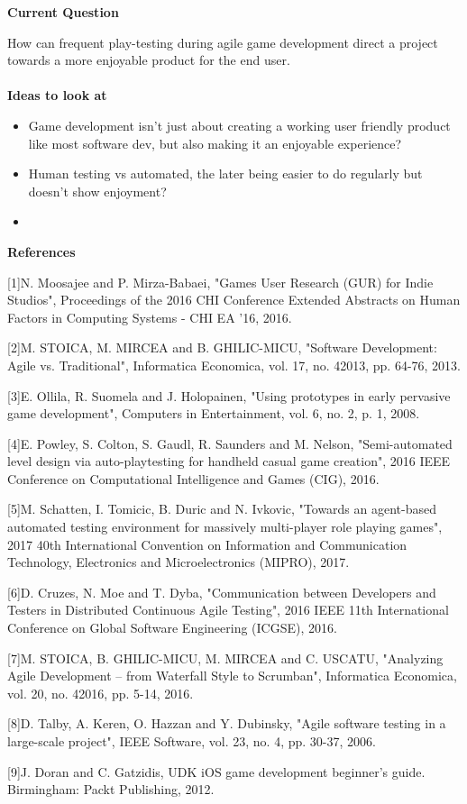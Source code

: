 \documentclass{article}
\begin{document}
	\noindent
	\large\textbf{Current Question}
	
	\normalsize How can frequent play-testing during agile game development direct a project towards a more enjoyable product for the end user.\\
	\\
	\noindent
	\large\textbf{Ideas to look at}
	\begin{itemize}
	  \normalsize\item Game development isn't just about creating a working user friendly product like most software dev, but also making it an enjoyable experience?
	  \item Human testing vs automated, the later being easier to do regularly but doesn't show enjoyment?
	  \item
	\end{itemize}
	\large\textbf{References}
	
	\normalsize[1]N. Moosajee and P. Mirza-Babaei, "Games User Research (GUR) for Indie Studios", Proceedings of the 2016 CHI Conference Extended Abstracts on Human Factors in Computing Systems - CHI EA '16, 2016.
	
	[2]M. STOICA, M. MIRCEA and B. GHILIC-MICU, "Software Development: Agile vs. Traditional", Informatica Economica, vol. 17, no. 42013, pp. 64-76, 2013.
	
	[3]E. Ollila, R. Suomela and J. Holopainen, "Using prototypes in early pervasive game development", Computers in Entertainment, vol. 6, no. 2, p. 1, 2008.
	
	[4]E. Powley, S. Colton, S. Gaudl, R. Saunders and M. Nelson, "Semi-automated level design via auto-playtesting for handheld casual game creation", 2016 IEEE Conference on Computational Intelligence and Games (CIG), 2016.
	
	[5]M. Schatten, I. Tomicic, B. Duric and N. Ivkovic, "Towards an agent-based automated testing environment for massively multi-player role playing games", 2017 40th International Convention on Information and Communication Technology, Electronics and Microelectronics (MIPRO), 2017.
	
	[6]D. Cruzes, N. Moe and T. Dyba, "Communication between Developers and Testers in Distributed Continuous Agile Testing", 2016 IEEE 11th International Conference on Global Software Engineering (ICGSE), 2016. 
	
	[7]M. STOICA, B. GHILIC-MICU, M. MIRCEA and C. USCATU, "Analyzing Agile Development – from Waterfall Style to Scrumban", Informatica Economica, vol. 20, no. 42016, pp. 5-14, 2016.
	
	[8]D. Talby, A. Keren, O. Hazzan and Y. Dubinsky, "Agile software testing in a large-scale project", IEEE Software, vol. 23, no. 4, pp. 30-37, 2006.
	
	[9]J. Doran and C. Gatzidis, UDK iOS game development beginner's guide. Birmingham: Packt Publishing, 2012.
\end{document}
